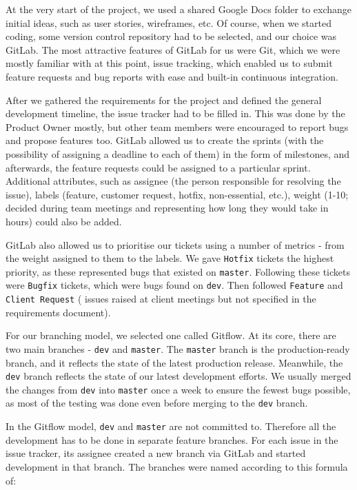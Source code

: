 \documentclass{l3proj}
\begin{document}
At the very start of the project, we used a shared Google Docs folder
 to exchange initial ideas, such as user stories, wireframes, etc.
 Of course, when we started coding, some version control
 repository had to be selected, and our choice was GitLab.
 The most attractive features of GitLab for us were
 Git, which we were mostly familiar with at this point, issue
 tracking, which enabled us to submit feature requests and bug reports
 with ease and built-in continuous integration.

After we gathered the requirements for the project and defined the general
 development timeline, the issue tracker had to be filled in. This was done by 
 the Product Owner mostly, but other team members were encouraged to report bugs and
 propose features too. GitLab allowed
 us to create the sprints (with the possibility of assigning a deadline
 to each of them) in the form of milestones, and afterwards, the feature 
 requests could be assigned to a
 particular sprint. Additional attributes, such as assignee (the person
 responsible for resolving the issue), labels (feature, customer request,
 hotfix, non-essential, etc.), weight (1-10; decided during team meetings
 and representing how long they would take in hours) could also be added.
 
GitLab also allowed us to prioritise our tickets using a number of metrics - 
 from the weight assigned to them to the labels. We gave \texttt{Hotfix} tickets
 the highest priority, as these represented bugs that existed on \texttt{master}. 
 Following these tickets were \texttt{Bugfix} tickets, which were bugs found on 
 \texttt{dev}. Then followed \texttt{Feature} and \texttt{Client Request} (
 issues raised at client meetings but not specified in the requirements document). 

For our branching model, we selected one called Gitflow\cite{gitflow}. At
 its core, there are two main branches - \texttt{dev} and \texttt{master}. The \texttt{master} branch
 is the production-ready branch, and it reflects the state of the latest
 production release. Meanwhile, the \texttt{dev} branch reflects the state of our
 latest development efforts. We usually merged the changes from \texttt{dev} into
 \texttt{master} once a week to ensure the fewest bugs possible, as most
 of the testing was done even before merging to the \texttt{dev} branch.



In the Gitflow model, \texttt{dev} and \texttt{master} are not committed to. Therefore
 all the development has to be done in separate feature branches. 
 For each issue in the issue tracker, its assignee created a
 new branch via GitLab and started development in that branch. The 
 branches were named according to this formula of:
 
\end{document}
